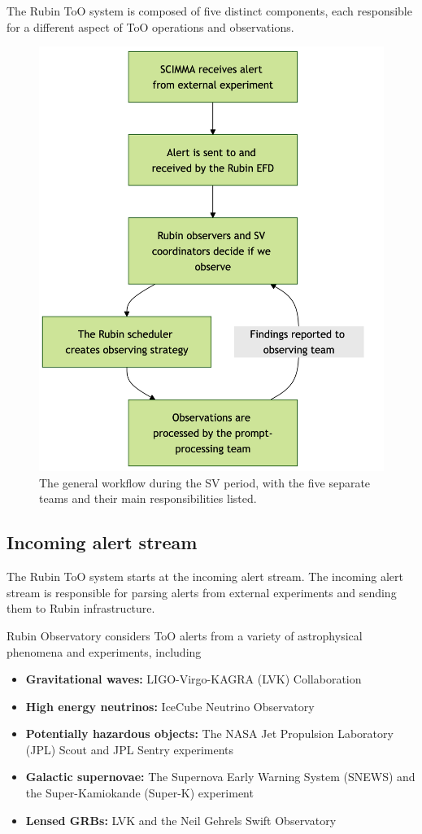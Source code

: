 The Rubin ToO system is composed of five distinct components, each responsible for a different aspect of ToO operations and observations.

\begin{figure}
    \centering
    \includegraphics[width=0.6\linewidth]{figures/workflowDiagram.png}
    \caption{The general workflow during the SV period, with the five separate teams and their main responsibilities listed.}
    \label{fig:workflowDiagram}
\end{figure}

\subsection{Incoming alert stream}\label{subsec:alertStream}

The Rubin ToO system starts at the incoming alert stream. The incoming alert stream is responsible for parsing alerts from external experiments and sending them to Rubin infrastructure.

Rubin Observatory considers ToO alerts from a variety of astrophysical phenomena and experiments, including 

\begin{itemize}
    \item \textbf{Gravitational waves:} LIGO-Virgo-KAGRA (LVK) Collaboration
    \item \textbf{High energy neutrinos:} IceCube Neutrino Observatory
    \item \textbf{Potentially hazardous objects:} The NASA Jet Propulsion Laboratory (JPL) Scout and JPL Sentry experiments
    \item \textbf{Galactic supernovae:} The Supernova Early Warning System (SNEWS) and the Super-Kamiokande (Super-K) experiment
    \item \textbf{Lensed GRBs:} LVK and the Neil Gehrels Swift Observatory
\end{itemize}

